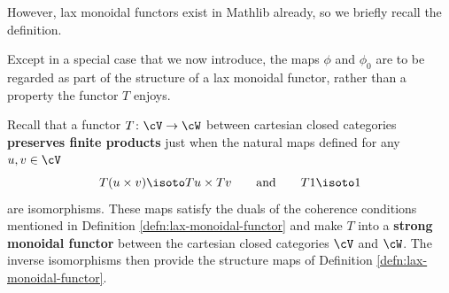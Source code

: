 However, lax monoidal functors exist in Mathlib already, so we briefly recall the definition.



Except in a special case that we now introduce, the maps $\phi$ and $\phi_0$ are to be regarded as part of the structure of a lax monoidal functor, rather than a property the functor $T$ enjoys.

Recall that a functor $T \colon \cV \to \cW$ between cartesian closed categories \textbf{preserves finite products} just when the natural maps defined for any $u,v \in \cV$
\[ T(u \times v) \isoto Tu \times Tv \qquad \text{and} \qquad T1 \isoto 1\]
are isomorphisms. These maps satisfy the duals of the coherence conditions mentioned in Definition \ref{defn:lax-monoidal-functor} and  make $T$ into a \textbf{strong monoidal functor} between the cartesian closed categories $\cV$ and $\cW$. The inverse isomorphisms then provide the structure maps of Definition \ref{defn:lax-monoidal-functor}. %

